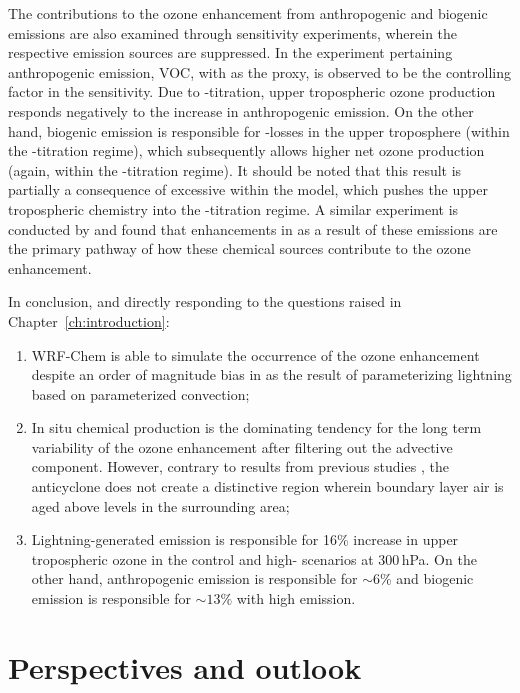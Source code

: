 The contributions to the ozone enhancement from anthropogenic and biogenic emissions are also examined
through sensitivity experiments, wherein the respective emission sources are suppressed. In the
experiment pertaining anthropogenic emission, VOC, with  as the proxy, is observed
to be the controlling factor in the sensitivity. Due to -titration, upper tropospheric
ozone production responds negatively to the increase in anthropogenic emission. On the other hand, biogenic
emission is responsible for -losses in the upper troposphere (within the
-titration regime), which subsequently allows higher net ozone production (again,
within the -titration regime). It should be noted that this result is partially a consequence
of excessive {\lnox} within the model, which pushes the upper tropospheric chemistry into the -titration
regime. A similar experiment is conducted by \citet{Li:2005ss} and found that enhancements in  as a result of
these emissions are the primary pathway of how these chemical sources contribute to the ozone enhancement.

In conclusion, and directly responding to the questions raised in Chapter~\ref{ch:introduction}:
\begin{enumerate}
	\item WRF-Chem is able to simulate the occurrence of the ozone enhancement despite an
	order of magnitude bias in  as the result of parameterizing lightning based on
	parameterized convection;
	\item In situ chemical production is the dominating tendency for the long term variability of
	the ozone enhancement after filtering out the advective component. However, contrary to
	results from previous studies \citep[e.g.][]{Li:2005ss,Cooper:2007cr,Barth:2012qf}, the
	anticyclone does not create a distinctive region wherein boundary layer air is aged above
	levels in the surrounding area;
	\item Lightning-generated  emission is responsible for 16\% increase in upper
	tropospheric ozone in the control and high- scenarios at 300\,\unit{hPa}.
	On the other hand, anthropogenic emission is responsible for $\sim6\%$ and biogenic
	emission is responsible for $\sim13\%$ with high {\lnox} emission.
\end{enumerate}

\section{Perspectives and outlook}

